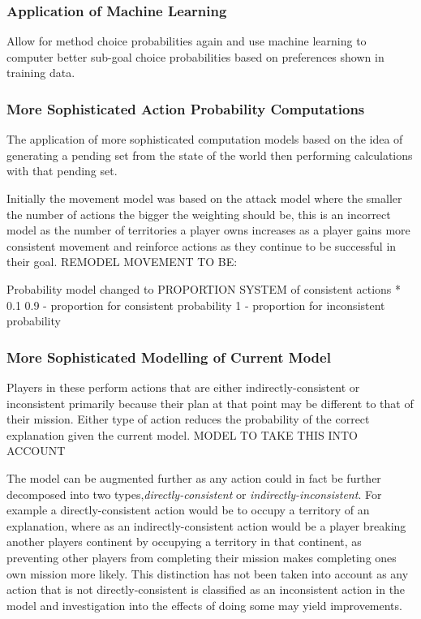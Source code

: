 \documentclass[parskip]{cs4rep}
\begin{document}
\subsubsection{Application of Machine Learning}

Allow for method choice probabilities again and use machine learning to computer better sub-goal choice probabilities based on preferences shown in training data.

\subsubsection{More Sophisticated Action Probability Computations}

The application of more sophisticated computation models based on the idea of generating a pending set from the state of the world then performing calculations with that pending set.

Initially the movement model was based on the attack model where the smaller the number of actions the bigger the weighting should be, this is an incorrect model as the number of territories a player owns increases as a player gains more consistent movement and reinforce actions as they continue to be successful in their goal. REMODEL MOVEMENT TO BE:

Probability model changed to PROPORTION SYSTEM of consistent actions * 0.1 
0.9 - proportion for consistent probability
1 - proportion for inconsistent probability

\subsubsection{More Sophisticated Modelling of Current Model}


Players in these perform actions that are either indirectly-consistent or inconsistent  primarily because their plan at that point may be different to that of their mission. Either type of action reduces the probability of the correct explanation given the current model. MODEL TO TAKE THIS INTO ACCOUNT

The model can be augmented further as any action could in fact be further decomposed into two types,\textit{directly-consistent} or \textit{indirectly-inconsistent}. For example a directly-consistent action would be to occupy a territory of an explanation, where as an indirectly-consistent action would be a player breaking another players continent by occupying a territory in that continent, as preventing other players from completing their mission makes completing ones own mission more likely. This distinction has not been taken into account as any action that is not directly-consistent is classified as an inconsistent action in the model and investigation into the effects of doing some may yield improvements.
\end{document}
